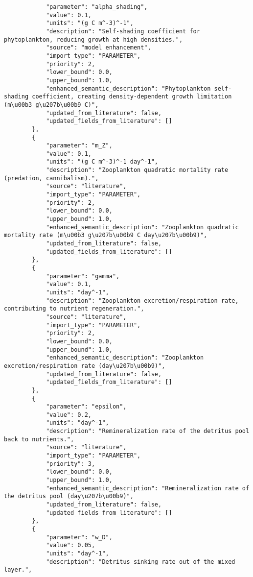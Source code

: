 \begin{lstlisting}
            "parameter": "alpha_shading",
            "value": 0.1,
            "units": "(g C m^-3)^-1",
            "description": "Self-shading coefficient for phytoplankton, reducing growth at high densities.",
            "source": "model enhancement",
            "import_type": "PARAMETER",
            "priority": 2,
            "lower_bound": 0.0,
            "upper_bound": 1.0,
            "enhanced_semantic_description": "Phytoplankton self-shading coefficient, creating density-dependent growth limitation (m\u00b3 g\u207b\u00b9 C)",
            "updated_from_literature": false,
            "updated_fields_from_literature": []
        },
        {
            "parameter": "m_Z",
            "value": 0.1,
            "units": "(g C m^-3)^-1 day^-1",
            "description": "Zooplankton quadratic mortality rate (predation, cannibalism).",
            "source": "literature",
            "import_type": "PARAMETER",
            "priority": 2,
            "lower_bound": 0.0,
            "upper_bound": 1.0,
            "enhanced_semantic_description": "Zooplankton quadratic mortality rate (m\u00b3 g\u207b\u00b9 C day\u207b\u00b9)",
            "updated_from_literature": false,
            "updated_fields_from_literature": []
        },
        {
            "parameter": "gamma",
            "value": 0.1,
            "units": "day^-1",
            "description": "Zooplankton excretion/respiration rate, contributing to nutrient regeneration.",
            "source": "literature",
            "import_type": "PARAMETER",
            "priority": 2,
            "lower_bound": 0.0,
            "upper_bound": 1.0,
            "enhanced_semantic_description": "Zooplankton excretion/respiration rate (day\u207b\u00b9)",
            "updated_from_literature": false,
            "updated_fields_from_literature": []
        },
        {
            "parameter": "epsilon",
            "value": 0.2,
            "units": "day^-1",
            "description": "Remineralization rate of the detritus pool back to nutrients.",
            "source": "literature",
            "import_type": "PARAMETER",
            "priority": 3,
            "lower_bound": 0.0,
            "upper_bound": 1.0,
            "enhanced_semantic_description": "Remineralization rate of the detritus pool (day\u207b\u00b9)",
            "updated_from_literature": false,
            "updated_fields_from_literature": []
        },
        {
            "parameter": "w_D",
            "value": 0.05,
            "units": "day^-1",
            "description": "Detritus sinking rate out of the mixed layer.",

\end{lstlisting}
